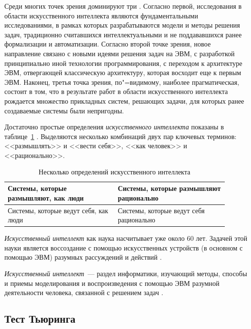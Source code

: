 \documentclass[a4paper,14pt, openany, twoside, draft]{extbook} %
\begin{document}
Среди многих точек зрения доминируют три \cite{AIDictionary}. Согласно первой, исследования в области искусственного интеллекта являются фундаментальными исследованиями, в рамках которых разрабатываются модели и методы решения задач, традиционно считавшихся интеллектуальными и не поддававшихся ранее формализации и автоматизации. Согласно второй точке зрения, новое направление связано с новыми идеями решения задач на ЭВМ, с разработкой принципиально иной технологии программирования, с переходом к архитектуре ЭВМ, отвергающей классическую архитектуру, которая восходит еще к первым ЭВМ. Наконец, третья точка зрения, по"=видимому, наиболее прагматическая, состоит в том, что в результате работ в области искусственного интеллекта рождается множество прикладных систем, решающих задачи, для которых ранее создаваемые системы были непригодны.

Достаточно простые определения {\em искусственного интеллекта} показаны в таблице~\ref{pic:determai} \cite{Russell}. Выделяются несколько комбинаций двух пар ключевых терминов: <<размышлять>> и <<вести себя>>, <<как человек>> и <<рационально>>.

\begin{table}[h]
\begin{center}
\caption{Несколько определений искусственного интеллекта} \label{pic:determai}%
\begin{tabular}{|p{0.45\linewidth}|p{0.45\linewidth}|}
 \hline
   Системы, которые размышляют, как люди
 &
   Системы, которые размышляют рационально
 \\ \hline
   Системы, которые ведут себя, как люди
 &
   Системы, которые ведут себя рационально
 \\  \hline
\end{tabular}
\end{center}
\end{table}

{\em Искусственный интеллект} как наука насчитывает уже около 60 лет. Задачей этой науки является воссоздание с помощью искусственных устройств (в основном с помощью ЭВМ) разумных рассуждений и действий \cite{Lauriere}.

{\em Искусственный интеллект}~--- раздел информатики, изучающий методы, способы и приемы моделирования и воспроизведения с помощью ЭВМ разумной деятельности человека, связанной с решением задач \cite{math_slov:88}.

\subsection{Тест Тьюринга}
\end{document}

